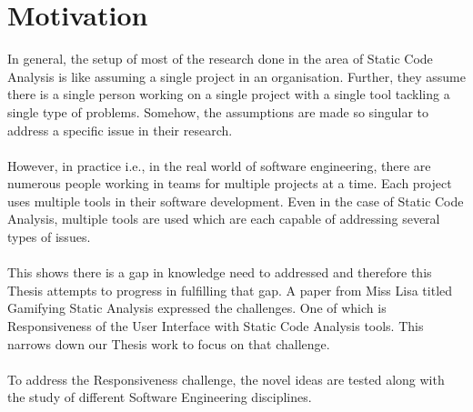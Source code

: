 \chapter{Motivation}
\label{ch:motivation}

In general, the setup of most of the research done in the area of Static Code Analysis is like assuming a single project in an organisation. Further, they assume there is a single person working on a single project with a single tool tackling a single type of problems.  Somehow, the assumptions are made so singular to address a specific issue in their research. \\ \\
However, in practice i.e., in the real world of software engineering, there are numerous people working in teams for multiple projects at a time. Each project uses multiple tools in their software development. Even in the case of Static Code Analysis, multiple tools are used which are each capable of addressing several types of issues. \\ \\
This shows there is a gap in knowledge need to addressed and therefore this Thesis attempts to progress in fulfilling that gap. A paper from Miss Lisa titled Gamifying Static Analysis expressed the challenges. One of which is Responsiveness of the User Interface with Static Code Analysis tools. This narrows down our Thesis work to focus on that challenge. \\ \\
To address the Responsiveness challenge, the novel ideas are tested along with the study of different Software Engineering disciplines.

